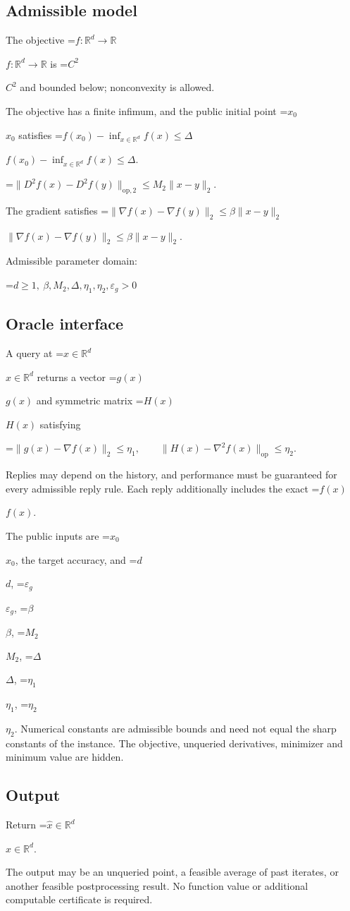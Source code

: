 \documentclass[10pt,a4paper]{article}
\newcommand{\AtlasMath}[1]{\par\begingroup\centering\setbox0=\hbox{$\displaystyle #1$}\ifdim\wd0>1.4\linewidth\typeout{ATLAS WIDE FORMULA: \the\wd0}\fi\ifdim\wd0>\linewidth\resizebox{\linewidth}{!}{\box0}\else\box0\fi\par\endgroup}
\newcommand{\AtlasInlineMath}[1]{\begingroup\setbox0=\hbox{$#1$}\ifdim\wd0>.4\linewidth\endgroup\AtlasMath{#1}\else\endgroup$#1$\fi}
\begin{document}
\subsection{Admissible model}
The objective \AtlasInlineMath{f:\mathbb{R}^d\to\mathbb{R}} is \AtlasInlineMath{C^2} and bounded below; nonconvexity is allowed.

The objective has a finite infimum, and the public initial point \AtlasInlineMath{x_0} satisfies \AtlasInlineMath{f(x_0)-\inf_{x\in \mathbb{R}^d}f(x)\le\Delta}.


\AtlasMath{\|D^{2}f(x)-D^{2}f(y)\|_{\mathrm{op},2}\le M_2\|x-y\|_{2}.}


The gradient satisfies \AtlasInlineMath{\|\nabla f(x)-\nabla f(y)\|_2\le\beta\|x-y\|_2}.

Admissible parameter domain:


\AtlasMath{d\ge1,\ \beta,M_2,\Delta,\eta_1,\eta_2,\varepsilon_g>0}


\subsection{Oracle interface}
A query at \AtlasInlineMath{x\in\mathbb{R}^d} returns a vector \AtlasInlineMath{g(x)} and symmetric matrix \AtlasInlineMath{H(x)} satisfying


\AtlasMath{\|g(x)-\nabla f(x)\|_2\le\eta_1,\qquad\|H(x)-\nabla^2f(x)\|_{\mathrm{op}}\le\eta_2.}


Replies may depend on the history, and performance must be guaranteed for every admissible reply rule. Each reply additionally includes the exact \AtlasInlineMath{f(x)}.

The public inputs are \AtlasInlineMath{x_0}, the target accuracy, and \AtlasInlineMath{d}, \AtlasInlineMath{\varepsilon_g}, \AtlasInlineMath{\beta}, \AtlasInlineMath{M_2}, \AtlasInlineMath{\Delta}, \AtlasInlineMath{\eta_1}, \AtlasInlineMath{\eta_2}. Numerical constants are admissible bounds and need not equal the sharp constants of the instance. The objective, unqueried derivatives, minimizer and minimum value are hidden.

\subsection{Output}
Return \AtlasInlineMath{\widehat{x}\in \mathbb{R}^d}.

The output may be an unqueried point, a feasible average of past iterates, or another feasible postprocessing result. No function value or additional computable certificate is required.
\end{document}
